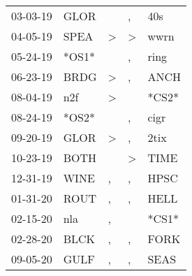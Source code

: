 \begin{supertabular}{p{0.07\textwidth}p{0.06\textwidth}p{0.02\textwidth}p{0.02\textwidth}p{0.06\textwidth}}
          03-03-19\textsuperscript{} &           GLOR\textsuperscript{} &                  &             , &   40s\textsuperscript{} \\
          04-05-19\textsuperscript{} &           SPEA\textsuperscript{} &     \textgreater &  \textgreater &  wwrn\textsuperscript{} \\
          05-24-19\textsuperscript{} &                            *OS1* &                  &             , &  ring\textsuperscript{} \\
          06-23-19\textsuperscript{} &           BRDG\textsuperscript{} &     \textgreater &             , &  ANCH\textsuperscript{} \\
          08-04-19\textsuperscript{} &            n2f\textsuperscript{} &     \textgreater &               &                   *CS2* \\
          08-24-19\textsuperscript{} &                            *OS2* &                  &             , &  cigr\textsuperscript{} \\
          09-20-19\textsuperscript{} &           GLOR\textsuperscript{} &     \textgreater &             , &  2tix\textsuperscript{} \\
          10-23-19\textsuperscript{} &           BOTH\textsuperscript{} &                  &  \textgreater &  TIME\textsuperscript{} \\
          12-31-19\textsuperscript{} &           WINE\textsuperscript{} &                , &             , &  HPSC\textsuperscript{} \\
          01-31-20\textsuperscript{} &           ROUT\textsuperscript{} &                , &             , &  HELL\textsuperscript{} \\
          02-15-20\textsuperscript{} &            nla\textsuperscript{} &                , &               &                   *CS1* \\
          02-28-20\textsuperscript{} &           BLCK\textsuperscript{} &                , &             , &  FORK\textsuperscript{} \\
          09-05-20\textsuperscript{} &           GULF\textsuperscript{} &                , &             , &  SEAS\textsuperscript{} \\
\end{supertabular}
